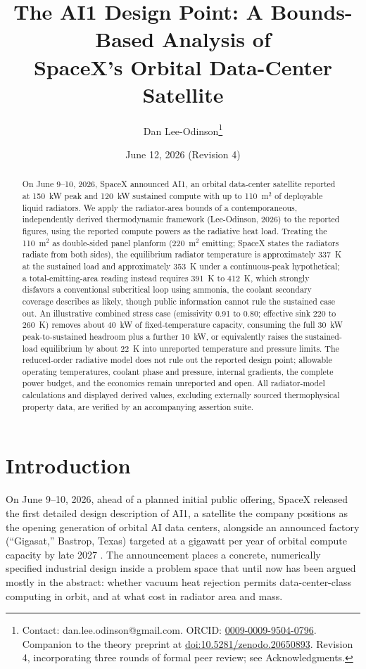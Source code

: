 \documentclass[11pt]{article}
\title{The AI1 Design Point: A Bounds-Based Analysis of\\ SpaceX's Orbital Data-Center Satellite}
\author{Dan Lee-Odinson\thanks{Contact: dan.lee.odinson@gmail.com. ORCID: \href{https://orcid.org/0009-0009-9504-0796}{0009-0009-9504-0796}. Companion to the theory preprint at \href{https://doi.org/10.5281/zenodo.20650893}{doi:10.5281/zenodo.20650893}. Revision 4, incorporating three rounds of formal peer review; see Acknowledgments.}}
\date{June 12, 2026 (Revision 4)}
\begin{document}
\maketitle

\begin{abstract}
On June 9--10, 2026, SpaceX announced AI1, an orbital data-center satellite reported at 150~kW peak and 120~kW sustained compute with up to 110~m$^{2}$ of deployable liquid radiators. We apply the radiator-area bounds of a contemporaneous, independently derived thermodynamic framework (Lee-Odinson, 2026) to the reported figures, using the reported compute powers as the radiative heat load. Treating the 110~m$^{2}$ as double-sided panel planform (220~m$^{2}$ emitting; SpaceX states the radiators radiate from both sides), the equilibrium radiator temperature is approximately 337~K at the sustained load and approximately 353~K under a continuous-peak hypothetical; a total-emitting-area reading instead requires 391~K to 412~K, which strongly disfavors a conventional subcritical loop using ammonia, the coolant secondary coverage describes as likely, though public information cannot rule the sustained case out. An illustrative combined stress case (emissivity 0.91 to 0.80; effective sink 220 to 260~K) removes about 40~kW of fixed-temperature capacity, consuming the full 30~kW peak-to-sustained headroom plus a further 10~kW, or equivalently raises the sustained-load equilibrium by about 22~K into unreported temperature and pressure limits. The reduced-order radiative model does not rule out the reported design point; allowable operating temperatures, coolant phase and pressure, internal gradients, the complete power budget, and the economics remain unreported and open. All radiator-model calculations and displayed derived values, excluding externally sourced thermophysical property data, are verified by an accompanying assertion suite.
\end{abstract}

\section{Introduction}

On June 9--10, 2026, ahead of a planned initial public offering, SpaceX released the first detailed design description of AI1, a satellite the company positions as the opening generation of orbital AI data centers, alongside an announced factory (``Gigasat,'' Bastrop, Texas) targeted at a gigawatt per year of orbital compute capacity by late 2027 \cite{dcd2026,toms2026,tomsgigasat2026}. The announcement places a concrete, numerically specified industrial design inside a problem space that until now has been argued mostly in the abstract: whether vacuum heat rejection permits data-center-class computing in orbit, and at what cost in radiator area and mass.
\end{document}
